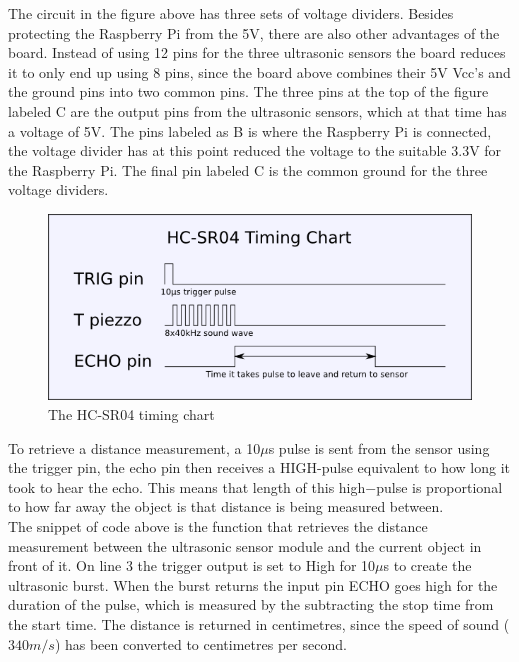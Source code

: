 The circuit in the figure above has three sets of voltage dividers. Besides protecting the Raspberry Pi from the 5V, there are also other advantages of the board. Instead of using 12 pins for the three ultrasonic sensors the board reduces it to only end up using 8 pins, since the board above combines their 5V Vcc's and the ground pins into two common pins.  
The three pins at the top of the figure labeled C are the output pins from the ultrasonic sensors, which at that time has a voltage of 5V. The pins labeled as B is where the Raspberry Pi is connected, the voltage divider has at this point reduced the voltage to the suitable 3.3V for the Raspberry Pi.  
The final pin labeled C is the common ground for the three voltage dividers.
\begin{figure}[H]
	\centering
	\includegraphics[width=.45\linewidth]{images/hcsr04timingchart.png}
	\caption{The HC-SR04 timing chart\cite{hcsr04timingchart}}
	\label{timingchartpic}
\end{figure}
To retrieve a distance measurement, a 10$\mu$s pulse is sent from the sensor using the trigger pin, the echo pin then receives a HIGH-pulse equivalent to how long it took to hear the echo. This means that length of this high$-$pulse is proportional to how far away the object is that distance is being measured between.\cite{ultrasonichowitworks}\\

The snippet of code above is the function that retrieves the distance measurement between the ultrasonic sensor module and the current object in front of it.
On line 3 the trigger output is set to High for 10$\mu$s to create the ultrasonic burst. When the burst returns the input pin ECHO goes high for the duration of the pulse, which is measured by the subtracting the stop time from the start time.
The distance is returned in centimetres, since the speed of sound ($340m/s$) has been converted to centimetres per second.
